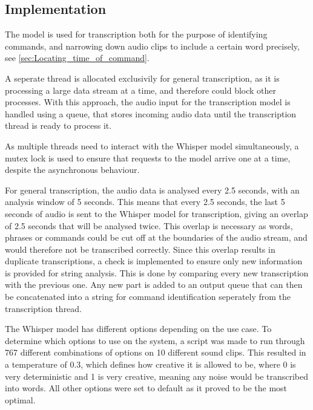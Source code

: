 \subsection{Implementation}
The model is used for transcription both for the purpose of identifying commands, and narrowing down audio clips to include a certain word precisely, see \cref{sec:Locating_time_of_command}. 

A seperate thread is allocated exclusivily for general transcription, as it is processing a large data stream at a time, and therefore could block other processes. With this approach, the audio input for the transcription model is handled using a queue, that stores incoming audio data until the transcription thread is ready to process it.

As multiple threads need to interact with the Whisper model simultaneously, a mutex lock is used to ensure that requests to the model arrive one at a time, despite the asynchronous behaviour.

For general transcription, the audio data is analysed every 2.5 seconds, with an analysis window of 5 seconds. This means that every 2.5 seconds, the last 5 seconds of audio is sent to the Whisper model for transcription, giving an overlap of 2.5 seconds that will be analysed twice. This overlap is necessary as words, phrases or commands could be cut off at the boundaries of the audio stream, and would therefore not be transcribed correctly. Since this overlap results in duplicate transcriptions, a check is implemented to ensure only new information is provided for string analysis. This is done by comparing every new transcription with the previous one. Any new part is added to an output queue that can then be concatenated into a string for command identification seperately from the transcription thread.

The Whisper model has different options depending on the use case. To determine which options to use on the system, a script was made to run through 767 different combinations of options on 10 different sound clips. This resulted in a temperature of 0.3, which defines how creative it is allowed to be, where 0 is very deterministic and 1 is very creative, meaning any noise would be transcribed into words. All other options were set to default as it proved to be the most optimal.
